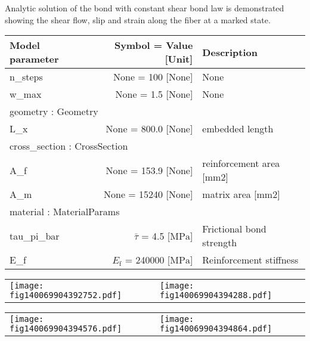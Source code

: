 \documentclass{article}
\newcounter{bmcsexample}
\begin{document}
        
\begin{bmcsexample}
\noindent Analytic solution of the bond with constant shear
    bond law is demonstrated showing the shear flow, slip and strain
    along the fiber at a marked state.
 \\[3mm]
\begin{center}
\begin{tabular}{lrp{4cm}}\hline
Model parameter & Symbol = Value [Unit] & Description  \\\hline \hline
n\_steps & None = 100 [None] & {\footnotesize None}  \\
            w\_max & None = 1.5 [None] & {\footnotesize None}  \\
            \hline
\multicolumn{3}{l}{geometry : Geometry}\\ \hline

L\_x & None = 800.0 [None] & {\footnotesize embedded length}  \\
            \hline
\multicolumn{3}{l}{cross\_section : CrossSection}\\ \hline

A\_f & None = 153.9 [None] & {\footnotesize reinforcement area [mm2]}  \\
            A\_m & None = 15240 [None] & {\footnotesize matrix area [mm2]}  \\
            \hline
\multicolumn{3}{l}{material : MaterialParams}\\ \hline

tau\_pi\_bar & $\bar{\tau}$ = 4.5 [$\mathrm{MPa}$] & {\footnotesize Frictional bond strength}  \\
            E\_f & $E_\mathrm{f}$ = 240000 [$\mathrm{MPa}$] & {\footnotesize Reinforcement stiffness}  \\
            \hline \end{tabular}


\end{center}

\noindent
\begin{tabular}{L{7.5cm}L{7.5cm}}
\texttt{[image: fig140069904392752.pdf]}
 & 
\texttt{[image: fig140069904394288.pdf]}
 \\\end{tabular}

\noindent
\begin{tabular}{L{7.5cm}L{7.5cm}}
\texttt{[image: fig140069904394576.pdf]}
 & 
\texttt{[image: fig140069904394864.pdf]}
 \\\end{tabular}

\end{bmcsexample}
\end{document}
